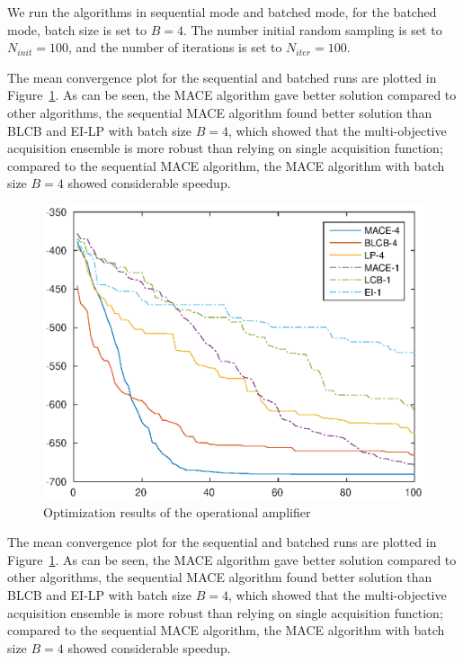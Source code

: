 We run the algorithms in sequential mode and batched mode, for the batched
mode, batch size is set to $B = 4$. The number initial random sampling is set
to $N_{init} = 100$, and the number of iterations is set to $N_{iter} = 100$.

The mean convergence plot for the sequential and batched runs are plotted in
Figure~\ref{fig:resDAC2014}. As can be seen, the MACE algorithm gave better
solution compared to other algorithms, the sequential MACE algorithm found
better solution than BLCB and EI-LP with batch size $B = 4$, which showed that
the multi-objective acquisition ensemble is more robust than relying on single
acquisition function; compared to the sequential MACE algorithm, the MACE
algorithm with batch size $B = 4$ showed considerable speedup.

\begin{figure}[htbp]
\vskip 0.2in
\begin{center}
\centerline{\includegraphics[width=\columnwidth]{./img/mean_DAC2014.eps}}
\caption{Optimization results of the operational amplifier}
\label{fig:resDAC2014}
\end{center}
\vskip -0.2in
\end{figure}

The mean convergence plot for the sequential and batched runs are plotted in
Figure~\ref{fig:resDAC2014}. As can be seen, the MACE algorithm gave better
solution compared to other algorithms, the sequential MACE algorithm found
better solution than BLCB and EI-LP with batch size $B = 4$, which showed that
the multi-objective acquisition ensemble is more robust than relying on single
acquisition function; compared to the sequential MACE algorithm, the MACE
algorithm with batch size $B = 4$ showed considerable speedup.

